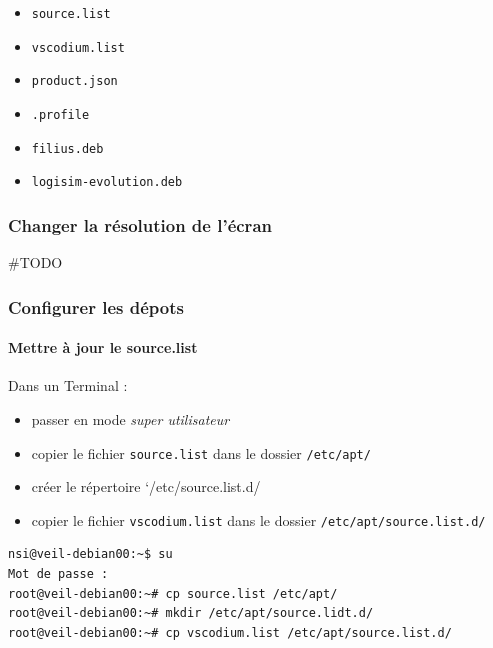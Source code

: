 \documentclass[11pt]{article}
\providecommand{\tightlist}{%
      \setlength{\itemsep}{0pt}\setlength{\parskip}{0pt}}
\begin{document}
    \begin{itemize}
\tightlist
\item
  \texttt{source.list}
\item
  \texttt{vscodium.list}
\item
  \texttt{product.json}
\item
  \texttt{.profile}
\item
  \texttt{filius.deb}
\item
  \texttt{logisim-evolution.deb}
\end{itemize}

    \hypertarget{changer-la-ruxe9solution-de-luxe9cran}{%
\subsubsection{Changer la résolution de
l'écran}\label{changer-la-ruxe9solution-de-luxe9cran}}

    \#TODO

    \hypertarget{configurer-les-duxe9pots}{%
\subsubsection{Configurer les dépots}\label{configurer-les-duxe9pots}}

    \hypertarget{mettre-uxe0-jour-le-source.list}{%
\paragraph{Mettre à jour le
source.list}\label{mettre-uxe0-jour-le-source.list}}

Dans un Terminal :

\begin{itemize}
\tightlist
\item
  passer en mode \emph{super utilisateur}
\item
  copier le fichier \texttt{source.list} dans le dossier
  \texttt{/etc/apt/}
\item
  créer le répertoire `/etc/source.list.d/
\item
  copier le fichier \texttt{vscodium.list} dans le dossier
  \texttt{/etc/apt/source.list.d/}
\end{itemize}

\begin{verbatim}
nsi@veil-debian00:~$ su
Mot de passe : 
root@veil-debian00:~# cp source.list /etc/apt/
root@veil-debian00:~# mkdir /etc/apt/source.lidt.d/
root@veil-debian00:~# cp vscodium.list /etc/apt/source.list.d/
\end{verbatim}
\end{document}
